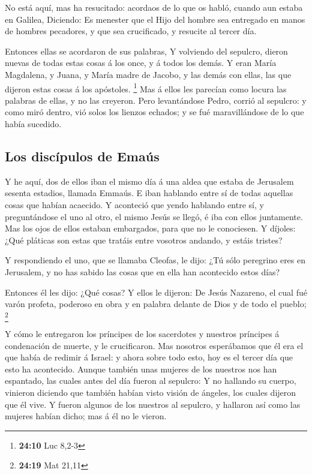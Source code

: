  No está aquí, mas ha resucitado: acordaos de lo que os
habló, cuando aun estaba en Galilea,  Diciendo: Es
menester que el Hijo del hombre sea entregado en manos de hombres
pecadores, y que sea crucificado, y resucite al tercer día.

 Entonces ellas se acordaron de sus palabras,
 Y volviendo del sepulcro, dieron nuevas de todas estas
cosas á los once, y á todos los demás.  Y eran María
Magdalena, y Juana, y María madre de Jacobo, y las demás con ellas, las
que dijeron estas cosas á los apóstoles. \footnote{\textbf{24:10} Luc
  8,2-3}  Mas á ellos les parecían como locura las
palabras de ellas, y no las creyeron.  Pero levantándose
Pedro, corrió al sepulcro: y como miró dentro, vió solos los lienzos
echados; y se fué maravillándose de lo que había sucedido.

\hypertarget{los-discuxedpulos-de-emauxfas}{%
\subsection{Los discípulos de
Emaús}\label{los-discuxedpulos-de-emauxfas}}

 Y he aquí, dos de ellos iban el mismo día á una aldea
que estaba de Jerusalem sesenta estadios, llamada Emmaús.
 E iban hablando entre sí de todas aquellas cosas que
habían acaecido.  Y aconteció que yendo hablando entre
sí, y preguntándose el uno al otro, el mismo Jesús se llegó, é iba con
ellos juntamente.  Mas los ojos de ellos estaban
embargados, para que no le conociesen.  Y díjoles: ¿Qué
pláticas son estas que tratáis entre vosotros andando, y estáis tristes?

 Y respondiendo el uno, que se llamaba Cleofas, le dijo:
¿Tú sólo peregrino eres en Jerusalem, y no has sabido las cosas que en
ella han acontecido estos días?

 Entonces él les dijo: ¿Qué cosas? Y ellos le dijeron: De
Jesús Nazareno, el cual fué varón profeta, poderoso en obra y en palabra
delante de Dios y de todo el pueblo; \footnote{\textbf{24:19} Mat 21,11}

 Y cómo le entregaron los príncipes de los sacerdotes y
nuestros príncipes á condenación de muerte, y le crucificaron.
 Mas nosotros esperábamos que él era el que había de
redimir á Israel: y ahora sobre todo esto, hoy es el tercer día que esto
ha acontecido.  Aunque también unas mujeres de los
nuestros nos han espantado, las cuales antes del día fueron al sepulcro:
 Y no hallando su cuerpo, vinieron diciendo que también
habían visto visión de ángeles, los cuales dijeron que él vive.
 Y fueron algunos de los nuestros al sepulcro, y hallaron
así como las mujeres habían dicho; mas á él no le vieron.

